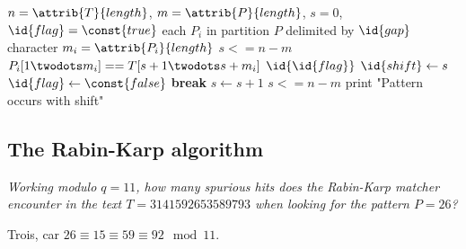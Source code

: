 \begin{description}
\begin{ex}
\begin{codebox}
    \li $n = \attrib{T}{length}$,  $m = \attrib{P}{length}$, $s = 0$, $\id{flag} = \const{true}$
    \li \For each $P_i$ in partition $P$ delimited by $\id{gap}$ character \Do
    \li $m_i = \attrib{P_i}{length}$
    \li \While $s <= n - m$ \Do
    \li \If $P_i[1\twodots m_i] == T[s + 1\twodots s + m_i]$ \Then
    \li \If $\id{\id{flag}}$ \Then
    \li $\id{shift} \gets s$
    \li $\id{flag} \gets \const{false}$ \End
    \li \textbf{break}
    \li \Else 
    \li $s \gets s + 1$ \End \End \End
    \li \If $s <= n-m$ \Then
    \li print "Pattern occurs with shift"  \End
\end{codebox}
\end{ex}

\end{description}

\subsection{The Rabin-Karp algorithm}

\begin{description}
 \textit{Working modulo $q = 11$, how many spurious hits does the Rabin-Karp matcher encounter in the text $T = 3141592653589793$ when looking for the pattern $P = 26$?}
\begin{ex}
Trois, car $26 \equiv 15 \equiv 59 \equiv 92\mod 11$.
\end{ex}
 \textit{}
 \textit{}
 \textit{}
\end{description}


